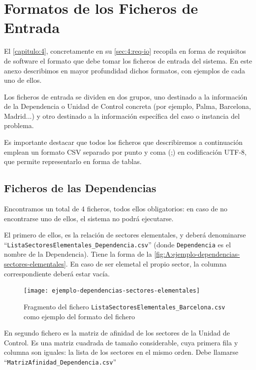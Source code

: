 \graphicspath{{anexos/AnexoA-Formato-Planificacion-Inicial/recursos/}}

\section{Formatos de los Ficheros de Entrada} \label{Anexo:formato-planificacion-inicial}

El \autoref{capitulo:4}, concretamente en su \autoref{sec:4:req-io} recopila en forma de requisitos de software el formato que debe tomar los ficheros de entrada del sistema. En este anexo describimos en mayor profundidad dichos formatos, con ejemplos de cada uno de ellos.

Los ficheros de entrada se dividen en dos grupos, uno destinado a la información de la Dependencia o Unidad de Control concreta (por ejemplo, Palma, Barcelona, Madrid...) y otro destinado a la información específica del caso o instancia del problema.

Es importante destacar que todos los ficheros que describiremos a continuación emplean un formato CSV separado por punto y coma (;) en codificación UTF-8, que permite representarlo en forma de tablas.

\subsection{Ficheros de las Dependencias}

Encontramos un total de 4 ficheros, todos ellos obligatorios: en caso de no encontrarse uno de ellos, el sistema no podrá ejecutarse.

El primero de ellos, es la relación de sectores elementales, y deberá denominarse ``\texttt{ListaSectoresElementales\_Dependencia.csv}'' (donde \texttt{Dependencia} es el nombre de la Dependencia). Tiene la forma de la \autoref{fig:A:ejemplo-dependencias-sectores-elementales}. En caso de ser elemetal el propio sector, la columna correspondiente deberá estar vacía.

\begin{figure}[h]
	\centering
	\texttt{[image: ejemplo-dependencias-sectores-elementales]}
	\caption{Fragmento del fichero \texttt{ListaSectoresElementales\_Barcelona.csv} como ejemplo del formato del fichero}
	\label{fig:A:ejemplo-dependencias-sectores-elementales}
\end{figure}

En segundo fichero es la matriz de afinidad de los sectores de la Unidad de Control. Es una matriz cuadrada de tamaño considerable, cuya primera fila y columna son iguales: la lista de los sectores en el mismo orden. Debe llamarse ``\texttt{MatrizAfinidad\_Dependencia.csv}''

